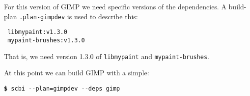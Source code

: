 \documentclass[a4paper,12pt,twoside]{article}
\newcommand{\code}[1]{\texttt{#1}}
\newcommand{\cmd}[1]{\tabto{1cm}\hspace{0.5cm}\texttt{\textbf{\$} #1}}
\newcommand{\ddash}{-{}-}
\begin{document}
For this version of GIMP we need specific versions of the dependencies. A build-plan \code{.plan-gimpdev} is used to describe this:

\begin{lstlisting}
 libmypaint:v1.3.0
 mypaint-brushes:v1.3.0
\end{lstlisting}

That is, we need version 1.3.0 of \code{libmypaint} and \code{mypaint-brushes}.

At this point we can build GIMP with a simple:

\cmd{scbi \ddash{}plan=gimpdev \ddash{}deps gimp}

\printindex

\end{document}

